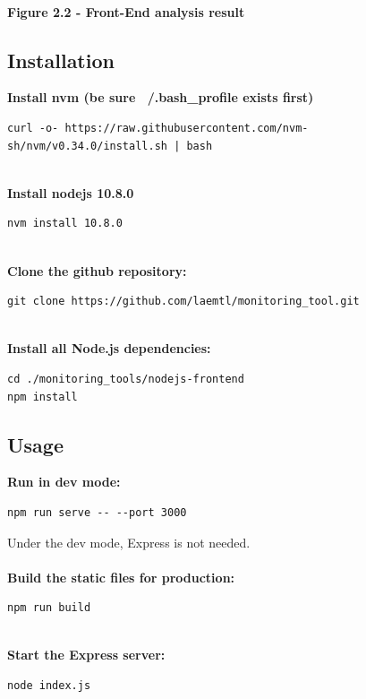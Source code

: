 \documentclass[12pt,hidelinks]{article}
\begin{document}
\begin{center}
	 \\
	\textbf{Figure 2.2 - Front-End analysis result}
\end{center}


\subsection{Installation} 
\textbf{Install nvm (be sure ~/.bash\_profile exists first)}
\begin{verbatim}
curl -o- https://raw.githubusercontent.com/nvm-sh/nvm/v0.34.0/install.sh | bash
\end{verbatim}
\\
\textbf{Install nodejs 10.8.0}
\begin{verbatim}
nvm install 10.8.0
\end{verbatim}
\\
\textbf{Clone the github repository:}
\begin{verbatim}
git clone https://github.com/laemtl/monitoring_tool.git
\end{verbatim}
\\
\textbf{Install all Node.js dependencies:}
\begin{verbatim}
cd ./monitoring_tools/nodejs-frontend
npm install
\end{verbatim}

\subsection{Usage}
\textbf{Run in dev mode:}
\begin{verbatim}
npm run serve -- --port 3000
\end{verbatim}
Under the dev mode, Express is not needed. \\
\\
\textbf{Build the static files for production:}
\begin{verbatim}
npm run build
\end{verbatim}
\\
\textbf{Start the Express server:}
\begin{verbatim}
node index.js
\end{verbatim}
\end{document}
